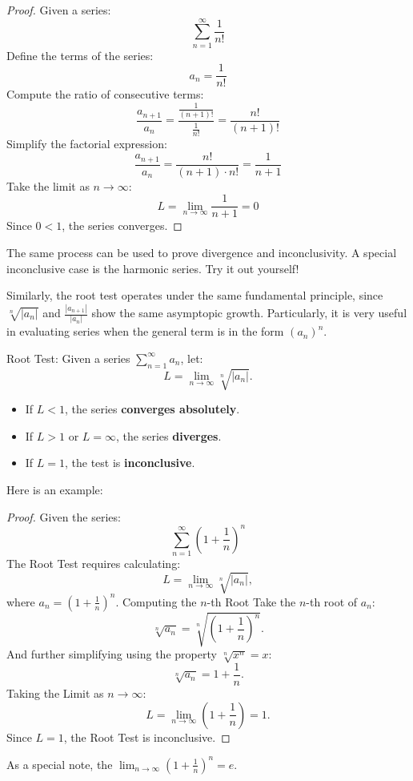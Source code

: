 \documentclass[a4paper, 11pt]{article}
\newenvironment{concept}{%
    \vspace{1em}
    \begin{tcolorbox}[colframe=black!70, colback=white!95, title=Definition]
}{%
    \end{tcolorbox}
    \vspace{1em}
}
\begin{document}
\begin{proof}
Given a series: 
    \[\sum_{n=1}^{\infty}\frac{1}{n!}\]
Define the terms of the series:
\[a_n = \frac{1}{n!}\]
Compute the ratio of consecutive terms:
\[\frac{a_{n+1}}{a_n} = \frac{\frac{1}{(n+1)!}}{\frac{1}{n!}} = \frac{n!}{(n+1)!}\]
Simplify the factorial expression:
\[\frac{a_{n+1}}{a_n} = \frac{n!}{(n+1) \cdot n!} = \frac{1}{n+1}\]
Take the limit as \( n \to \infty \):
\[L = \lim_{n \to \infty} \frac{1}{n+1} = 0\] Since $0 < 1$, the series converges. 
\end{proof}
The same process can be used to prove divergence and inconclusivity. A special inconclusive case is the harmonic series. Try it out yourself! 
\par 
Similarly, the root test operates under the same fundamental principle, since $\sqrt[n]{|a_n|}$ and $\frac{|a_{n+1}|}{|a_n|}$ show the same asymptopic growth. Particularly, it is very useful in evaluating series when the general term is in the form $(a_n)^n$. 

\begin{concept}{Root Test:}
Given a series \( \sum_{n=1}^\infty a_n \), let:
\[
L = \lim_{n \to \infty} \sqrt[n]{|a_n|}.
\]
\begin{itemize}
    \item If \( L < 1 \), the series \textbf{converges absolutely}.
    \item If \( L > 1 \) or \( L = \infty \), the series \textbf{diverges}.
    \item If \( L = 1 \), the test is \textbf{inconclusive}.
\end{itemize}
\end{concept}
Here is an example:
\begin{proof} 
Given the series:
\[\sum_{n=1}^{\infty} \left( 1 + \frac{1}{n} \right)^n \]
The Root Test requires calculating:
\[
L = \lim_{n \to \infty} \sqrt[n]{\left| a_n \right|},
\]
where \( a_n = \left( 1 + \frac{1}{n} \right)^n \). Computing the \( n \)-th Root
Take the \( n \)-th root of \( a_n \):
\[
\sqrt[n]{a_n} = \sqrt[n]{\left( 1 + \frac{1}{n} \right)^n}.
\]
And further simplifying using the property \( \sqrt[n]{x^n} = x \):
\[
\sqrt[n]{a_n} = 1 + \frac{1}{n}.
\]
Taking the Limit as \( n \to \infty \):
\[
L = \lim_{n \to \infty} \left( 1 + \frac{1}{n} \right) = 1.
\]
Since \( L = 1 \), the Root Test is inconclusive.
\end{proof}
As a special note, the $\lim_{n \to \infty} \left( 1 + \frac{1}{n} \right)^n = e$. 
\end{document}
